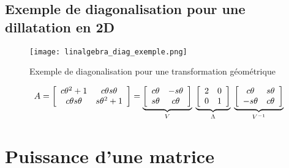 \subsection{Exemple de diagonalisation pour une dillatation en 2D}
\label{sec:ExempleDeDiagonalisationPourUneDillatationEn2D}

\begin{figure}[H]
	\centering
		\texttt{[image: linalgebra\_diag\_exemple.png]}
	\caption{Exemple de diagonalisation pour une transformation géométrique}
	\label{fig:linalgebra_diag_exemple}
\end{figure}

\begin{align}
A =
\left[ \begin{array}{c c}  
c\theta^2+1     & c\theta s\theta \\
c\theta s\theta & s\theta^2+1
\end{array} \right]
=
\underbrace{
\left[ \begin{array}{c c}  
c\theta & - s\theta \\ 
s\theta &   c\theta 
\end{array} \right]
}_{V}
\;
\underbrace{
\left[ \begin{array}{c c}  
2 & 0 \\
0 & 1 
\end{array} \right]
}_{\Lambda}
\;
\underbrace{
\left[ \begin{array}{c c}  
c\theta &   s\theta \\ 
- s\theta &   c\theta 
\end{array} \right]
}_{V^{-1}}
\end{align}









\section{Puissance d'une matrice}

